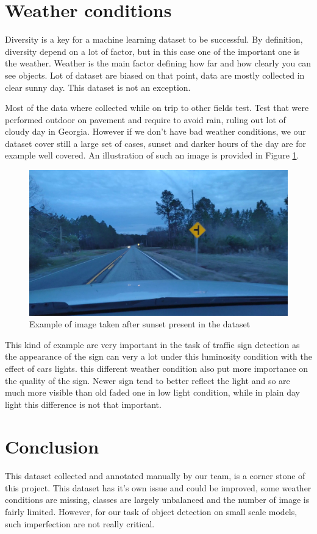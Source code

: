 \begin{appendices}
\section{Weather conditions}
Diversity is a key for a machine learning dataset to be successful. By definition, diversity depend on a lot of factor, but in this case one of the important one is the weather. Weather is the main factor defining how far and how clearly you can see objects. Lot of dataset are biased on that point, data are mostly collected in clear sunny day. This dataset is not an exception.

Most of the data where collected while on trip to other fields test. Test that were performed outdoor on pavement and require to avoid rain, ruling out lot of cloudy day in Georgia. However if we don't have bad weather conditions, we our dataset cover still a large set of cases, sunset and darker hours of the day are for example well covered. An illustration of such an image is provided in Figure \ref{fig:blue_hour}.

\begin{figure}
    \centering
    \includegraphics[width=.7\linewidth]{figures/blue_hour_example.jpg}
    \caption{Example of image taken after sunset present in the dataset}
    \label{fig:blue_hour}
\end{figure}{}

This kind of example are very important in the task of traffic sign detection as the appearance of the sign can very a lot under this luminosity condition with the effect of cars lights. this different weather condition also put more importance on the quality of the sign. Newer sign tend to better reflect the light and so are much more visible than old faded one in low light condition, while in plain day light this difference is not that important.

\section{Conclusion}
\paragraph{}
This dataset collected and annotated manually by our team, is a corner stone of this project. This dataset has it's own issue and could be improved, some weather conditions are missing, classes are largely unbalanced and the number of image is fairly limited. However, for our task of object detection on small scale models, such imperfection are not really critical.


\end{appendices}